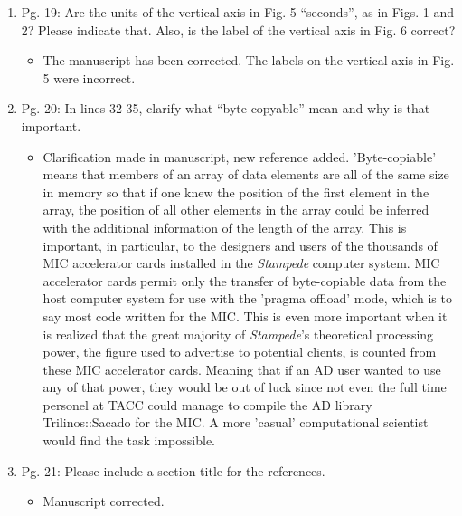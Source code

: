 \documentclass{article}
\begin{document}
\begin{enumerate}
    \item
        Pg. 19: Are the units of the vertical axis in Fig. 5 “seconds”, as in Figs. 1 and 2?
        Please indicate that. Also, is the label of the vertical axis in Fig. 6 correct?

{\color{red}  
\begin{itemize}
     \item
        The manuscript has been corrected. The labels on the vertical axis in Fig. 5 were incorrect. 
  \end{itemize}}

\item
Pg. 20: In lines 32-35, clarify what “byte-copyable” mean and why is that important.

{\color{red}  
\begin{itemize}
     \item
     Clarification made in manuscript, new reference added. 
     'Byte-copiable' means that members of an array of data elements are all of
     the same size in memory so that if one knew the position of the first
     element in the array, the position of all other elements in the array
     could be inferred with the additional information of the length of the
     array. This is important, in particular, to the designers and users of the
     thousands of MIC accelerator cards installed in the \emph{Stampede}
     computer system. MIC accelerator cards permit only the transfer of
     byte-copiable data from the host computer system for use with the 'pragma
     offload' mode, which is to say most code written for the MIC. This is even
     more important when it is realized that the great majority of
     \emph{Stampede}'s theoretical processing power, the figure used to advertise to potential clients, is counted from these MIC
     accelerator cards. Meaning that if an AD user wanted to use any of that
     power, they would be out of luck since not even the full time personel at
     TACC could manage to compile the AD library Trilinos::Sacado for the MIC.
     A more 'casual' computational scientist would find the task impossible.
  \end{itemize}}

 \item
    Pg. 21: Please include a section title for the references.

{\color{red}  
\begin{itemize}
     \item
         Manuscript corrected.
  \end{itemize}}


\end{enumerate}
\end{document}
